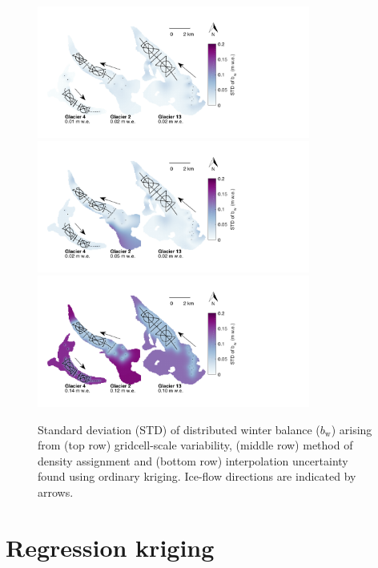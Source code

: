 \documentclass[onecolumn, letterpaper]{igs}
\begin{document}
\begin{figure}[H]
	\centering
	\includegraphics[width =0.8\textwidth]{OKstd_map_gridcell.pdf}\\
	\includegraphics[width =0.8\textwidth]{OKstd_map_density.pdf}\\
	\includegraphics[width =0.8\textwidth]{OKstd_map_int.pdf}\\
	\caption{Standard deviation (STD) of distributed winter balance ($b_\mathrm{w}$) arising from (top row) gridcell-scale variability, (middle row) method of density assignment and (bottom row) interpolation uncertainty found using ordinary kriging. Ice-flow directions are indicated by arrows.}
\end{figure}

\vfill


\section{Regression kriging}
\label{sec:regressionkriging}
\end{document}
